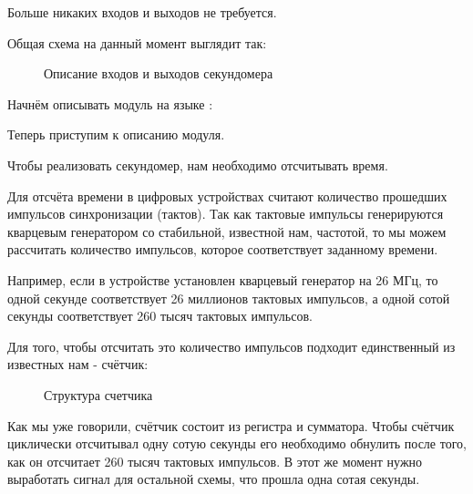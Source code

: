 \par{Больше никаких входов и выходов не требуется.}
\par{Общая схема на данный момент выглядит так:}

\begin{figure}[H]
	\centering
	\def\svgwidth{\columnwidth}
	
	\caption{Описание входов и выходов секундомера}
\end{figure}

\par{Начнём описывать модуль на языке :}



\par{Теперь приступим к описанию  модуля.}

\par{Чтобы реализовать секундомер, нам необходимо отсчитывать время.}

\par{Для отсчёта времени в цифровых устройствах считают количество прошедших импульсов синхронизации (тактов). Так как тактовые импульсы генерируются кварцевым генератором со стабильной, известной нам, частотой, то мы можем рассчитать количество импульсов, которое соответствует заданному времени.}

\par{Например, если в устройстве установлен кварцевый генератор на 26 МГц, то одной секунде соответствует 26 миллионов тактовых импульсов, а одной сотой секунды соответствует 260 тысяч тактовых импульсов.}

\par{Для того, чтобы отсчитать это количество импульсов подходит единственный из известных нам  - счётчик:}

\begin{figure}[H]
	\centering
	\def\svgwidth{\columnwidth}
	
	\caption{Структура счетчика}
\end{figure}


\par{Как мы уже говорили, счётчик состоит из регистра и сумматора. Чтобы счётчик циклически отсчитывал одну сотую секунды его необходимо обнулить после того, как он отсчитает 260 тысяч тактовых импульсов. В этот же момент нужно выработать сигнал для остальной схемы, что прошла одна сотая секунды.}

